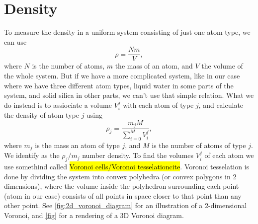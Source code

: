 \section{Density}
To measure the density in a uniform system consisting of just one atom type, we can use
\[
    \rho = \frac{Nm}{V},
\]
where $N$ is the number of atoms, $m$ the mass of an atom, and $V$ the volume of the whole system. But if we have a more complicated system, like in our case where we have three different atom types, liquid water in some parts of the system, and solid silica in other parts, we can't use that simple relation. What we do instead is to assiociate a volume $V_i^j$ with each atom of type $j$, and calculate the density of atom type $j$ using
\[
    \rho_j = \dfrac{m_jM}{\sum_{i=0}^M V_i^j},
\]
where $m_j$ is the mass an atom of type $j$, and $M$ is the number of atoms of type $j$. We identify as the $\rho_j/m_j$ number density. To find the volumes $V_i^j$ of each atom we use somethind called \hl{Voronoi cells/Voronoi tesselation}\hl{cite}. Voronoi tesselation is done by dividing the system into convex polyhedra (or convex polygons in 2 dimensions), where the volume inside the polyhedron surrounding each point (atom in our case) consists of all points in space closer to that point than any other point. See \cref{fig:2d_voronoi_diagram} for an illustration of a 2-dimensional Voronoi, and \cref{fig} for a rendering of a 3D Voronoi diagram.
%
